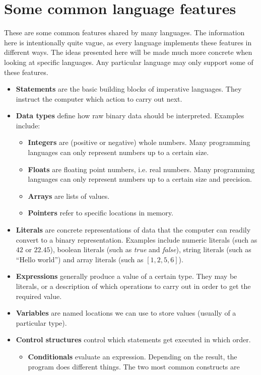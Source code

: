 \section{Some common language features}
These are some common features shared by many languages. The information here is intentionally quite vague, as every language implements these features in different ways. The ideas presented here will be made much more concrete when looking at specific languages. Any particular language may only support some of these features.
\begin{itemize}
\item \textbf{Statements} are the basic building blocks of imperative languages. They instruct the computer which action to carry out next.
\item \textbf{Data types} define how raw binary data should be interpreted. Examples include:
\begin{itemize}
\item \textbf{Integers} are (positive or negative) whole numbers. Many programming languages can only represent numbers up to a certain size.
\item \textbf{Floats} are floating point numbers, i.e. real numbers. Many programming languages can only represent numbers up to a certain size and precision.
\item \textbf{Arrays} are lists of values.
\item \textbf{Pointers} refer to specific locations in memory.
\end{itemize}
\item \textbf{Literals} are concrete representations of data that the computer can readily convert to a binary representation. Examples include numeric literals (such as $42$ or $22.45$), boolean literals (such as \textit{true} and \textit{false}), string literals (such as ``Hello world'') and array literals (such as $[1,2,5,6]$).
\item \textbf{Expressions} generally produce a value of a certain type. They may be literals, or a description of which operations to carry out in order to get the required value.
\item \textbf{Variables} are named locations we can use to store values (usually of a particular type).
\item \textbf{Control structures} control which statements get executed in which order.
\begin{itemize}
\item \textbf{Conditionals} evaluate an expression. Depending on the result, the program does different things. The two most common constructs are

\end{itemize}
\end{itemize}
